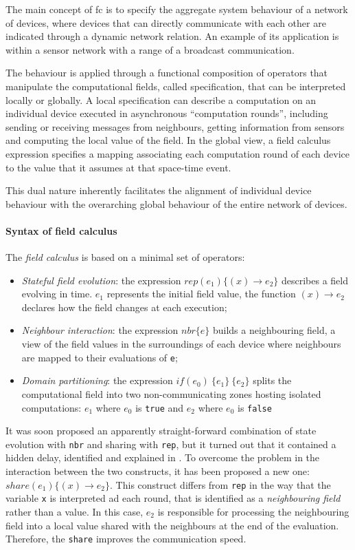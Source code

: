 The main concept of \ac{fc} is to specify the aggregate system behaviour of a network of devices, where devices that can
directly communicate with each other are indicated through a dynamic network relation.
An example of its application is within a sensor network with a range of a broadcast communication.

The behaviour is applied through a functional composition of operators that manipulate the computational fields,
called specification, that can be interpreted locally or globally.
A local specification can describe a computation on an individual device executed in asynchronous ``computation rounds'',
including sending or receiving messages from neighbours, getting information from sensors and computing the local value of the field.
In the global view, a field calculus expression specifies a mapping associating each computation round of each device to
the value that it assumes at that space-time event.

This dual nature inherently facilitates the alignment of individual device behaviour with the overarching global behaviour
of the entire network of devices.

\paragraph{Syntax of field calculus}
\label{par:syntax-of-field-calculus}

The \emph{field calculus} is based on a minimal set of operators:
\begin{itemize}
    \item \emph{Stateful field evolution}: the expression $rep(e_1)\{(x) \rightarrow e_2\}$ describes a field evolving in time.
        $e_1$ represents the initial field value, the function $(x) \rightarrow e_2$ declares how the field changes
        at each execution;
    \item \emph{Neighbour interaction}: the expression $nbr\{e\}$ builds a neighbouring field, a view of the field
        values in the surroundings of each device where neighbours are mapped to their evaluations of \texttt{e};
    \item \emph{Domain partitioning}: the expression $if(e_0)\ \{e_1\}\ \{e_2\}$ splits the computational field into
        two non-communicating zones hosting isolated computations: $e_1$ where  $e_0$ is \texttt{true} and
        $e_2$ where  $e_0$ is \texttt{false}
\end{itemize}

It was soon proposed an apparently straight-forward combination of state evolution with \texttt{nbr} and sharing with \texttt{rep},
but it turned out that it contained a hidden delay, identified and explained in \cite{fieldc}.
To overcome the problem in the interaction between the two constructs, it has been proposed a new one:
$share(e_1)\{(x) \rightarrow e_2\}$.
This construct differs from \texttt{rep} in the way that the variable \texttt{x} is interpreted ad each round, that is
identified as a \emph{neighbouring field} rather than a value.
In this case, $e_2$ is responsible for processing the neighbouring field into a local value shared with the
neighbours at the end of the evaluation.
Therefore, the \texttt{share} improves the communication speed.

